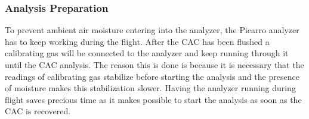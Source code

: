 

\subsubsection{Analysis Preparation}

To prevent ambient air moisture entering into the analyzer, the Picarro analyzer has to keep working during the flight. After the CAC has been flushed a calibrating gas will be connected to the analyzer and keep running through it until the CAC analysis. 
The reason this is done is because it is necessary that the readings of calibrating gas stabilize before starting the analysis and the presence of moisture makes this stabilization slower. Having the analyzer running during flight saves precious time as it makes possible to start the analysis as soon as the CAC is recovered. 






